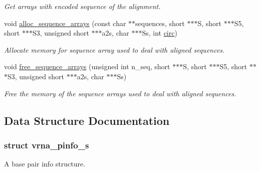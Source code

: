 \begin{DoxyCompactItemize}
\begin{DoxyCompactList}\small\item\em Get arrays with encoded sequence of the alignment. \end{DoxyCompactList}\item 
void \hyperlink{group__aln__utils_ga8a560930f7f2582cc3967723a86cfdfa}{alloc\+\_\+sequence\+\_\+arrays} (const char $\ast$$\ast$sequences, short $\ast$$\ast$$\ast$S, short $\ast$$\ast$$\ast$S5, short $\ast$$\ast$$\ast$S3, unsigned short $\ast$$\ast$$\ast$a2s, char $\ast$$\ast$$\ast$Ss, int \hyperlink{group__model__details_gaf9202a1a09f5828dc731e2d9a10fa111}{circ})
\begin{DoxyCompactList}\small\item\em Allocate memory for sequence array used to deal with aligned sequences. \end{DoxyCompactList}\item 
void \hyperlink{group__aln__utils_ga298a420a8c879202e2617b3f724fde38}{free\+\_\+sequence\+\_\+arrays} (unsigned int n\+\_\+seq, short $\ast$$\ast$$\ast$S, short $\ast$$\ast$$\ast$S5, short $\ast$$\ast$$\ast$S3, unsigned short $\ast$$\ast$$\ast$a2s, char $\ast$$\ast$$\ast$Ss)
\begin{DoxyCompactList}\small\item\em Free the memory of the sequence arrays used to deal with aligned sequences. \end{DoxyCompactList}\end{DoxyCompactItemize}


\subsection{Data Structure Documentation}
\label{structvrna__pinfo__s}
\subsubsection{struct vrna\+\_\+pinfo\+\_\+s}
A base pair info structure. 

